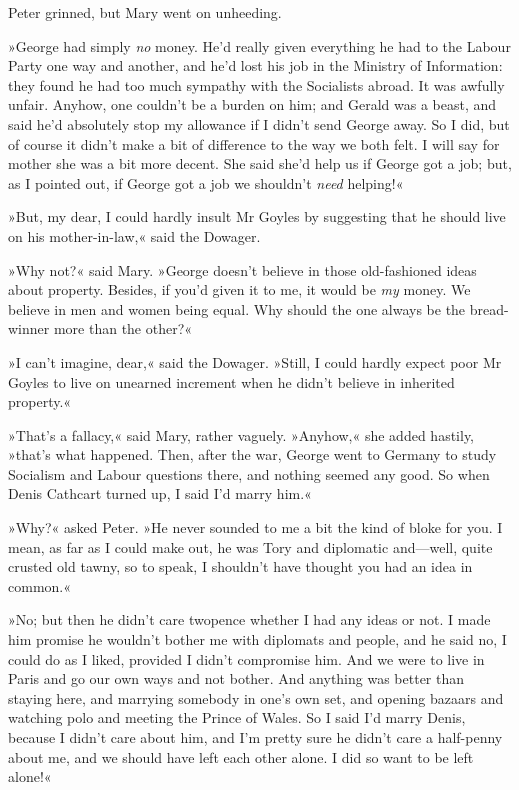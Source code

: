 Peter grinned, but Mary went on unheeding.

»George had simply \textit{no} money. He'd really given everything he had to the Labour Party one way and another, and he'd lost his job in the Ministry of Information: they found he had too much sympathy with the Socialists abroad. It was awfully unfair. Anyhow, one couldn't be a burden on him; and Gerald was a beast, and said he'd absolutely stop my allowance if I didn't send George away. So I did, but of course it didn't make a bit of difference to the way we both felt. I will say for mother she was a bit more decent. She said she'd help us if George got a job; but, as I pointed out, if George got a job we shouldn't \textit{need} helping!«

»But, my dear, I could hardly insult Mr Goyles by suggesting that he should live on his mother-in-law,« said the Dowager.

»Why not?« said Mary. »George doesn't believe in those old-fashioned ideas about property. Besides, if you'd given it to me, it would be \textit{my} money. We believe in men and women being equal. Why should the one always be the bread-winner more than the other?«

»I can't imagine, dear,« said the Dowager. »Still, I could hardly expect poor Mr Goyles to live on unearned increment when he didn't believe in inherited property.«

»That's a fallacy,« said Mary, rather vaguely. »Anyhow,« she added hastily, »that's what happened. Then, after the war, George went to Germany to study Socialism and Labour questions there, and nothing seemed any good. So when Denis Cathcart turned up, I said I'd marry him.«

»Why?« asked Peter. »He never sounded to me a bit the kind of bloke for you. I mean, as far as I could make out, he was Tory and diplomatic and—well, quite crusted old tawny, so to speak, I shouldn't have thought you had an idea in common.«

»No; but then he didn't care twopence whether I had any ideas or not. I made him promise he wouldn't bother me with diplomats and people, and he said no, I could do as I liked, provided I didn't compromise him.  And we were to live in Paris and go our own ways and not bother. And anything was better than staying here, and marrying somebody in one's own set, and opening bazaars and watching polo and meeting the Prince of Wales. So I said I'd marry Denis, because I didn't care about him, and I'm pretty sure he didn't care a half-penny about me, and we should have left each other alone. I did so want to be left alone!«

